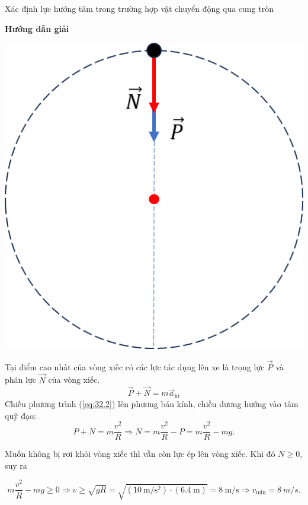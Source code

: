 \begin{dang}{Xác định lực hướng tâm trong trường hợp vật chuyển động qua cung tròn}
{	}
	{	\begin{center}
			\textbf{Hướng dẫn giải}
		\end{center}
		\begin{center}
			\includegraphics[width=0.3\linewidth]{../figs/VN10-2023-PH-TP032-3}
		\end{center}
		Tại điểm cao nhất của vòng xiếc có các lực tác dụng lên xe là trọng lực $\vec P$ và phản lực  $\vec N$ của vòng xiếc.	
		\begin{equation}
			\label{eq:32.3}
			\vec P+\vec N=m\vec a_\text{ht}
		\end{equation}
	Chiếu phương trình (\ref{eq:32.2}) lên phương bán kính, chiều dương hướng vào tâm quỹ đạo:
		$$P + N = m \dfrac{v^2}{R} \Rightarrow N  =  m \dfrac{v^2}{R} - P =m \dfrac{v^2}{R}-mg .$$
		
		Muốn không bị rơi khỏi vòng xiếc thì vẫn còn lực ép lên vòng xiếc. Khi đó $N \geq 0 $, suy ra
		
		$$ m \dfrac{v^2}{R}-mg \geq 0 \Rightarrow v \geq \sqrt{gR} =\sqrt{\left(\SI{10}{\meter/\second^2}\right)\cdot\left(\SI{6.4}{\meter}\right)}=\SI{8}{\meter/\second} \Rightarrow v_\text{min} = \SI{8}{m/s}.$$
		
		
	}
	
\end{dang}